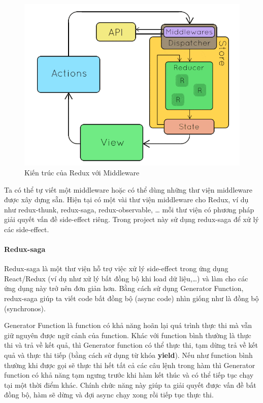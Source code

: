 \begin{figure}[H]
\centering
\includegraphics[width=12cm]{images/redux-architecture.png}
\caption{Kiến trúc của Redux với Middleware}
\end{figure}

Ta có thể tự viết một middleware hoặc có thể dùng những thư
viện middleware được xây dựng sẵn. Hiện tại có một vài thư viện
middleware cho Redux, ví dụ như redux-thunk, redux-saga,
redux-observable, … mỗi thư viện có phương pháp giải quyết
vấn đề side-effect riêng.
Trong project này sử dụng redux-saga để xử lý các side-effect.

\paragraph{Redux-saga}
Redux-saga là một thư viện hỗ trợ việc xử lý side-effect trong
ứng dụng React/Redux (ví dụ như xử lý bất đồng bộ khi load dữ liệu,…)
và làm cho các ứng dụng này trở nên đơn giản hơn.
Bằng cách sử dụng Generator Function, redux-saga giúp ta viết
code bất đồng bộ (async code) nhìn giống như là đồng bộ (synchronos).

Generator Function là function có khả năng hoãn lại quá trình
thực thi mà vẫn giữ nguyên được ngữ cảnh của function. Khác với
function bình thường là thực thi và trả về kết quả,
thì Generator function có thể thực thi, tạm dừng trả về
kết quả và thực thi tiếp (bằng cách sử dụng từ khóa \textbf{yield}).
Nếu như function bình thường khi được gọi sẽ thực thi hết tất cả
các câu lệnh trong hàm thì Generator function có khả năng tạm ngưng
trước khi hàm kết thúc và có thể tiếp tục chạy tại một thời điểm khác.
Chính chức năng này giúp ta giải quyết được vấn đề bất đồng bộ,
hàm sẽ dừng và đợi async chạy xong rồi tiếp tục thực thi.

